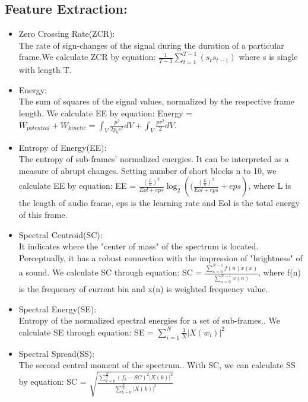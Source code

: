 \subsection{Feature Extraction:}
\begin{itemize}
	\item Zero Crossing Rate(ZCR):\\
	The rate of sign-changes of the signal during the duration of a particular frame.\cite{b1}We calculate ZCR by equation: $\frac{1}{T-1}\sum_{t = 1}^{T - 1}(s_t s_{t-1})$ where s is single with length T.\\
	\item Energy:\\
	The sum of squares of the signal values, normalized by the respective frame length.\cite{b2} We calculate EE by equation: Energy = $W_{potential} + W_{kinetic} = \int_{V}^{} \frac{p^2}{2p_0c^2} dV + \int_{V}^{} \frac{pv^2}{2}dV$.\\
	\item Entropy of Energy(EE):\\
	The entropy of sub-frames' normalized energies. It can be interpreted as a measure of abrupt changes.\cite{b2} Setting number of short blocks n to 10, we calculate EE by equation: EE = $\frac{(\frac{L}{n})^2}{Eol +eps} \log_{2}({(\frac{(\frac{L}{n})^2}{Eol +eps} + eps})$, where L is the length of audio frame, eps is the learning rate and Eol is the total energy of this frame.\\
	\item Spectral Centroid(SC):\\
	It indicates where the "center of mass" of the spectrum is located. Perceptually, it has a robust connection with the impression of "brightness" of a sound.\cite{b3} We calculate SC through equation: SC = $\frac{\sum_{n = 0}^{N - 1} f(n)x(x)}{\sum_{n = 0}^{N - 1} x(n)}$, where f(n) is the frequency of current bin and x(n) is weighted frequency value.\\
	\item Spectral Energy(SE):\cite{b1}\\
	Entropy of the normalized spectral energies for a set of sub-frames.\cite{b3}. We calculate SE through equation: SE = $\sum_{i = 1}^{N} \frac{1}{N} |X(w_i)|^2$ \\
	\item Spectral Spread(SS):\\
	The second central moment of the spectrum.\cite{b3}. With SC, we can calculate SS by equation: SC = $\sqrt{\frac{\sum_{k = 0}^{\frac{N}{2}} (f_k-SC)^2 |X(k)|^2}{\sum_{k = 0}^{\frac{N}{2}} |X(k)|^2 }}$\\

\end{itemize}
